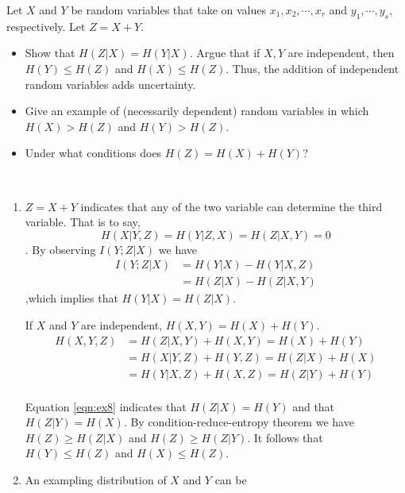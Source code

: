 \begin{exercise}{Let $X$ and $Y$ be random variables that take on values $x_1, x_2, \cdots , x_r$ and $y_1, \cdots, y_s$, respectively. Let $Z =
  X + Y$.
  \begin{itemize}
    \item Show that $H(Z|X) = H(Y|X)$. Argue that if $X, Y$ are independent, then $H(Y) \le H(Z)$ and $H(X) \le H(Z)$. Thus, the addition of independent random variables adds uncertainty.
    \item Give an example of (necessarily dependent) random variables in which $H(X) > H(Z)$ and $H(Y) > H(Z)$.
    \item Under what conditions does $H(Z) = H(X) + H(Y)$?
  \end{itemize}
}

\begin{solution}
  \par{~}
  \begin{enumerate}
    \item {
      $Z = X + Y$ indicates that any of the two variable can determine the third variable. That is to say, $$H(X|Y,Z)=H(Y|Z,X)=H(Z|X,Y) = 0$$. By observing $I(Y;Z|X)$ we have
      \begin{equation}
        \begin{aligned}
          I(Y;Z|X) &= H(Y|X) - H(Y|X,Z) \\
          &= H(Z|X) - H(Z|X,Y)
        \end{aligned}
      \end{equation}
      ,which implies that $H(Y|X)=H(Z|X)$.

      If $X$ and $Y$ are independent, $H(X,Y)=H(X)+H(Y)$.
      \begin{equation}
        \begin{aligned}
          H(X,Y,Z) &= H(Z|X,Y) + H(X,Y) = H(X)+H(Y)\\
          &= H(X|Y,Z)+H(Y,Z) = H(Z|X)+H(X) \\
          &= H(Y|X,Z)+H(X,Z) = H(Z|Y)+H(Y) \\
        \end{aligned}
        \label{eqn:ex8}
      \end{equation}

      Equation \ref{eqn:ex8} indicates that $H(Z|X)=H(Y)$ and that $H(Z|Y)=H(X)$. By condition-reduce-entropy theorem we have $H(Z) \ge H(Z|X)$ and $H(Z) \ge H(Z|Y)$. It follows that $H(Y) \le H(Z)$ and $H(X) \le H(Z)$.
    }
    \item {
      An exampling distribution of $X$ and $Y$ can be

}
\end{enumerate}
\end{solution}
\end{exercise}
